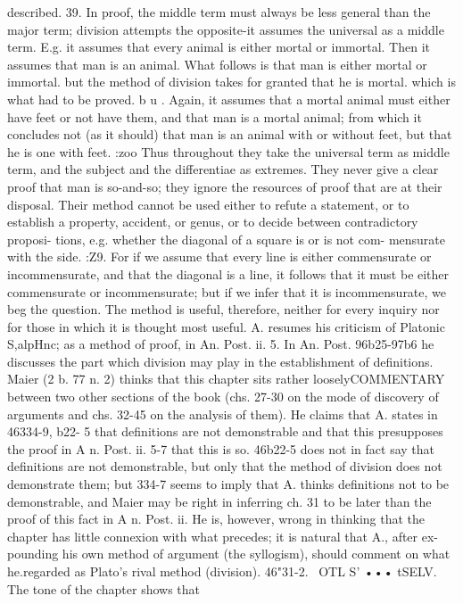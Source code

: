 {{{{{{{{{{{{{{{{{{{{{{{{described.
39. In proof, the middle term must always be less general than
the major term; division attempts the opposite-it assumes the
universal as a middle term. E.g. it assumes that every animal is
either mortal or immortal. Then it assumes that man is an
animal. What follows is that man is either mortal or immortal.
but the method of division takes for granted that he is mortal.
which is what had to be proved.
b u . Again, it assumes that a mortal animal must either have
feet or not have them, and that man is a mortal animal; from
which it concludes not (as it should) that man is an animal with
or without feet, but that he is one with feet.
:zoo Thus throughout they take the universal term as middle
term, and the subject and the differentiae as extremes. They
never give a clear proof that man is so-and-so; they ignore the
resources of proof that are at their disposal. Their method cannot
be used either to refute a statement, or to establish a property,
accident, or genus, or to decide between contradictory proposi-
tions, e.g. whether the diagonal of a square is or is not com-
mensurate with the side.
:Z9. For if we assume that every line is either commensurate or
incommensurate, and that the diagonal is a line, it follows that it
must be either commensurate or incommensurate; but if we infer
that it is incommensurate, we beg the question. The method is
useful, therefore, neither for every inquiry nor for those in which
it is thought most useful.
A. resumes his criticism of Platonic S,alpHnc; as a method of
proof, in An. Post. ii. 5. In An. Post. 96b25-97b6 he discusses
the part which division may play in the establishment of
definitions.
Maier (2 b. 77 n. 2) thinks that this chapter sits rather looselyCOMMENTARY
between two other sections of the book (chs. 27-30 on the mode
of discovery of arguments and chs. 32-45 on the analysis of them).
He claims that A. states in 46334-9, b22- 5 that definitions are not
demonstrable and that this presupposes the proof in A n. Post.
ii. 5-7 that this is so. 46b22-5 does not in fact say that definitions
are not demonstrable, but only that the method of division does
not demonstrate them; but 334-7 seems to imply that A. thinks
definitions not to be demonstrable, and Maier may be right in
inferring ch. 31 to be later than the proof of this fact in A n. Post.
ii. He is, however, wrong in thinking that the chapter has little
connexion with what precedes; it is natural that A., after ex-
pounding his own method of argument (the syllogism), should
comment on what he.regarded as Plato's rival method (division).
46"31-2. ~OTL S' ••• tSELV. The tone of the chapter shows that
}}}}}}}}}}}}}}}}}}}}}}}}
